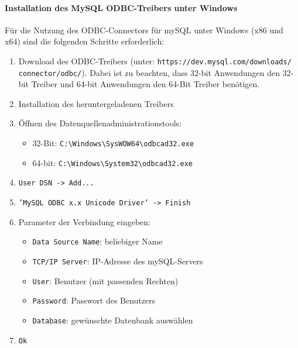 \paragraph{Installation des MySQL ODBC-Treibers unter Windows}

Für die Nutzung des ODBC-Connectors für mySQL unter Windows (x86 und x64) sind die folgenden Schritte erforderlich:
\begin{enumerate}
	\item Download des ODBC-Treibers (unter: \texttt{https://dev.mysql.com/downloads/\\connector/odbc/}). Dabei ist zu beachten, dass 32-bit Anwendungen den 32-bit Treiber und 64-bit Anwendungen den 64-Bit Treiber benötigen.
	\item Installation des heruntergeladenen Treibers
	\item Öffnen des Datenquellenadministrationstools:
	\begin{itemize}
		\item 32-Bit: \texttt{C:\textbackslash Windows\textbackslash SysWOW64\textbackslash odbcad32.exe}
		\item 64-bit: \texttt{C:\textbackslash Windows\textbackslash System32\textbackslash odbcad32.exe}
	\end{itemize}
	\item \texttt{User DSN -> Add...}
	\item \texttt{'MySQL ODBC x.x Unicode Driver' -> Finish}
	\item Parameter der Verbindung eingeben:
	\begin{itemize}
		\item \texttt{Data Source Name}: beliebiger Name
		\item \texttt{TCP/IP Server}: IP-Adresse des mySQL-Servers 
		\item \texttt{User}: Benutzer (mit passenden Rechten)
		\item \texttt{Password}: Passwort des Benutzers
		\item \texttt{Database}: gewünschte Datenbank auswählen
	\end{itemize}
	\item \texttt{Ok}
\end{enumerate}


\newpage


%


